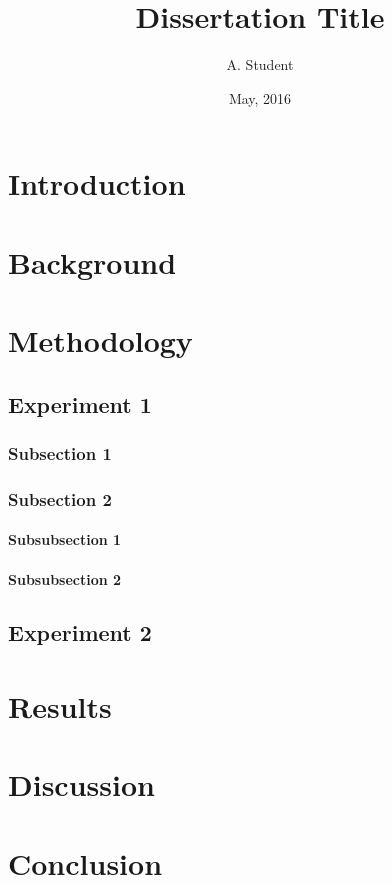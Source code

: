 \documentclass[beng]{bangoree}
\title{Dissertation Title}
\author{A. Student}
\date{May, 2016}
\begin{document}
\maketitle
\statements
\abstract{\lipsum[90-91]}
\acknowledgements{\lipsum[1]}
\tables

\content
\chapter{Introduction}
\lipsum[1-9]

\chapter{Background}
\lipsum[10-14]

\chapter{Methodology}
\section{Experiment 1}
\subsection{Subsection 1}
\lipsum[20-21]

\subsection{Subsection 2}
\subsubsection{Subsubsection 1}
\lipsum[21-22]

\subsubsection{Subsubsection 2}
\lipsum[22-24]

\section{Experiment 2}
\lipsum[24-26]

\chapter{Results}
\lipsum[50-53]

\chapter{Discussion}
\lipsum[55-58]

\chapter{Conclusion}
\lipsum[60]

\end{document}
